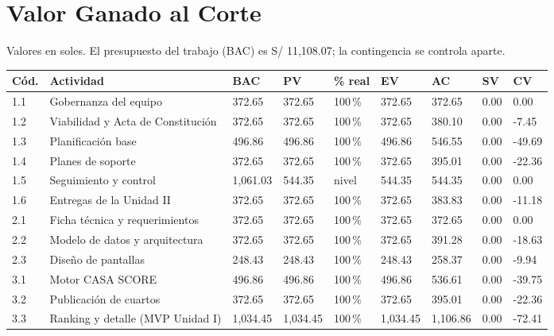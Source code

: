 \documentclass[11pt,a4paper]{article}
\begin{document}
\section{Valor Ganado al Corte}
Valores en soles. El presupuesto del trabajo (BAC) es S/ 11,108.07; la contingencia se controla aparte.

\vspace{0.1cm}
{\footnotesize
\setlength{\tabcolsep}{3pt}
\noindent\begin{tabularx}{\textwidth}{@{}C{0.7cm} L Q{1.4cm} Q{1.35cm} C{0.9cm} Q{1.35cm} Q{1.35cm} Q{1.4cm} Q{1.2cm}@{}}
\toprule
{}
\textbf{Cód.} & \textbf{Actividad} & \textbf{BAC} & \textbf{PV} & \textbf{\% real} & \textbf{EV} & \textbf{AC} & \textbf{SV} & \textbf{CV} \\
 & Gobernanza del equipo & 372.65 & 372.65 & 100\,\% & 372.65 & 372.65 & 0.00 & 0.00 \\
1.2 & Viabilidad y Acta de Constitución & 372.65 & 372.65 & 100\,\% & 372.65 & 380.10 & 0.00 & \textcolor{SevAlta}{-7.45} \\
1.3 & Planificación base & 496.86 & 496.86 & 100\,\% & 496.86 & 546.55 & 0.00 & \textcolor{SevAlta}{-49.69} \\
1.4 & Planes de soporte & 372.65 & 372.65 & 100\,\% & 372.65 & 395.01 & 0.00 & \textcolor{SevAlta}{-22.36} \\
1.5 & Seguimiento y control & 1,061.03 & 544.35 & nivel & 544.35 & 544.35 & 0.00 & 0.00 \\
1.6 & Entregas de la Unidad II & 372.65 & 372.65 & 100\,\% & 372.65 & 383.83 & 0.00 & \textcolor{SevAlta}{-11.18} \\
2.1 & Ficha técnica y requerimientos & 372.65 & 372.65 & 100\,\% & 372.65 & 372.65 & 0.00 & 0.00 \\
2.2 & Modelo de datos y arquitectura & 372.65 & 372.65 & 100\,\% & 372.65 & 391.28 & 0.00 & \textcolor{SevAlta}{-18.63} \\
2.3 & Diseño de pantallas & 248.43 & 248.43 & 100\,\% & 248.43 & 258.37 & 0.00 & \textcolor{SevAlta}{-9.94} \\
3.1 & Motor CASA SCORE & 496.86 & 496.86 & 100\,\% & 496.86 & 536.61 & 0.00 & \textcolor{SevAlta}{-39.75} \\
3.2 & Publicación de cuartos & 372.65 & 372.65 & 100\,\% & 372.65 & 395.01 & 0.00 & \textcolor{SevAlta}{-22.36} \\
3.3 & Ranking y detalle (MVP Unidad I) & 1,034.45 & 1,034.45 & 100\,\% & 1,034.45 & 1,106.86 & 0.00 & \textcolor{SevAlta}{-72.41} \\

\end{tabularx}}
\end{document}
